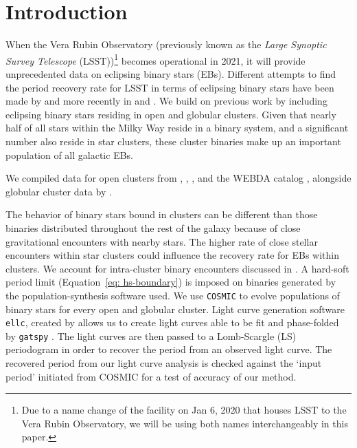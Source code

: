 \documentclass[twocolumn]{aastex63}
\begin{document}


\section{Introduction} \label{sec:Intro}
When the Vera Rubin Observatory (previously known as the \textit{Large Synoptic Survey Telescope} (LSST))\footnote{Due to a name change of the facility on Jan 6, 2020 that houses LSST to the Vera Rubin Observatory, we will be using both names interchangeably in this paper.} becomes operational in 2021, it will provide unprecedented data on eclipsing binary stars (EBs). Different attempts to find the period recovery rate for LSST in terms of eclipsing binary stars have been made by \citet{2011AJ....142...52P} and more recently in \citet{2017PASP.129f5003W} and \citet{2019AAS...23336317P}. We build on previous work by including eclipsing binary stars residing in open and globular clusters. Given that nearly half of all stars within the Milky Way reside in a binary system, and a significant number also reside in star clusters, these cluster binaries make up an important population of all galactic EBs. 

We compiled data for open clusters from \citet{2008A&A...477..165P}, \citet{2004A&A...414..163S}, \citet{2006AJ....131.1559V}, and the WEBDA catalog \citep{1995MNRAS.275..828M}, alongside globular cluster data by \citet{1996AJ....112.1487H}. 

The behavior of binary stars bound in clusters can be different than those binaries distributed throughout the rest of the galaxy because of close gravitational encounters with nearby stars. The higher rate of close stellar encounters within star clusters could influence the recovery rate for EBs within clusters. We account for intra-cluster binary encounters discussed in \citet{2015ApJ...808L..25G}. A hard-soft period limit (Equation~\ref{eq: hs-boundary}) is imposed on binaries generated by the population-synthesis software used. We use \texttt{COSMIC} \citep{2018PhDT........74B} to evolve populations of binary stars for every open and globular cluster. Light curve generation software \texttt{ellc}, created by \citet{2016ascl.soft03016M} allows us to create light curves able to be fit and phase-folded by \texttt{gatspy} \citep{2015ApJ...812...18V}. The light curves are then passed to a Lomb-Scargle (LS) periodogram in order to recover the period from an observed light curve. The recovered period from our light curve analysis is checked against the ‘input period’ initiated from COSMIC for a test of accuracy of our method.
\end{document}
